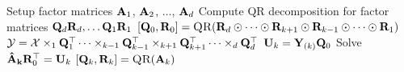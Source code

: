 \begin{algorithmic}[1]
      \State Setup factor matrices  $\mathbf{A}_1$, $\mathbf{A}_2$, $\dots$, $\mathbf{A}_d$
      \State Compute QR decomposition for factor matrices $\mathbf{Q}_d\mathbf{R}_d, \dots \mathbf{Q}_1\mathbf{R}_1$
      \State $[\mat{Q}_0,\mat{R}_0] = \Call{QR}{\mat{R}_d \odot \cdots \odot \mat{R}_{k+1} \odot \mat{R}_{k-1} \odot \cdots \odot \mat{R}_1}$
      \State ${\mathbf{\cal{Y}}} =  {\mathbf{\cal{X}}} \times_1 \mathbf{Q}_1^\top \dots \times_{k-1} \mathbf{Q}_{k-1}^\top \times_{k+1} \mathbf{Q}_{k+1}^\top \dots \times_d \mathbf{Q}_d^\top$  \label{l:EXP-TTM}
      \State $\mathbf{U}_k = \mathbf{Y}_{(k)}\mathbf{Q}_0$ \label{l:apply}
      \State Solve $\mathbf{\hat{A}_k}\mathbf{R}_0^\top = \mathbf{U}_k$ 
      \State $[\mat{Q}_k,\mat{R}_k] = \Call{QR}{\mat{A}_k}$      
      \EndFor
      \EndWhile
    \EndFunction
  \end{algorithmic}